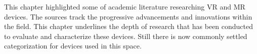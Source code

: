 This chapter highlighted some of academic literature researching VR and MR devices. The sources track the progressive advancements and innovations within the field. This chapter underlines the depth of research that has been conducted to evaluate and characterize these devices. Still there is now commonly settled categorization for devices used in this space.
